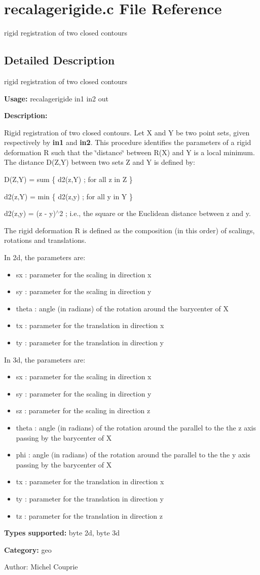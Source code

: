 \section{recalagerigide.c File Reference}
\label{recalagerigide_8c}
rigid registration of two closed contours  




\label{_details}
\subsection{Detailed Description}
rigid registration of two closed contours 

{\bf Usage:} recalagerigide in1 in2 out

{\bf Description:}

Rigid registration of two closed contours. Let X and Y be two point sets, given respectively by {\bf in1} and {\bf in2}. This procedure identifies the parameters of a rigid deformation R such that the \char`\"{}distance\char`\"{} between R(X) and Y is a local minimum. The distance D(Z,Y) between two sets Z and Y is defined by:

D(Z,Y) = sum \{ d2(z,Y) ; for all z in Z \}

d2(z,Y) = min \{ d2(z,y) ; for all y in Y \}

d2(z,y) = (z - y)$^\wedge$2 ; i.e., the square or the Euclidean distance between z and y.

The rigid deformation R is defined as the composition (in this order) of scalings, rotations and translations.

In 2d, the parameters are: \begin{itemize}
\item sx : parameter for the scaling in direction x \item sy : parameter for the scaling in direction y \item theta : angle (in radians) of the rotation around the barycenter of X \item tx : parameter for the translation in direction x \item ty : parameter for the translation in direction y\end{itemize}
In 3d, the parameters are: \begin{itemize}
\item sx : parameter for the scaling in direction x \item sy : parameter for the scaling in direction y \item sz : parameter for the scaling in direction z \item theta : angle (in radians) of the rotation around the parallel to the the z axis passing by the barycenter of X \item phi : angle (in radians) of the rotation around the parallel to the the y axis passing by the barycenter of X \item tx : parameter for the translation in direction x \item ty : parameter for the translation in direction y \item tz : parameter for the translation in direction z\end{itemize}
{\bf Types supported:} byte 2d, byte 3d

{\bf Category:} geo

\begin{Desc}
\item[Author:]Michel Couprie \end{Desc}
